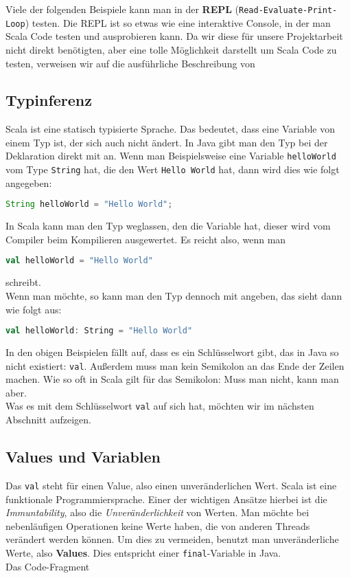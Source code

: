 Viele der folgenden Beispiele kann man in der \textbf{REPL} (\texttt{Read-Evaluate-Print-Loop}) testen. Die REPL ist so etwas wie eine interaktive Console, in der man Scala Code testen und ausprobieren kann. Da wir diese für unsere Projektarbeit nicht direkt benötigten, aber eine tolle Möglichkeit darstellt um Scala Code zu testen, verweisen wir auf die ausführliche Beschreibung von \cite{GettingStartedWithTheScalaREPL}

\subsection{Typinferenz}
Scala ist eine statisch typisierte Sprache. Das bedeutet, dass eine Variable von einem Typ ist, der sich auch nicht ändert. In Java gibt man den Typ bei der Deklaration direkt mit an. Wenn man Beispielsweise eine Variable \texttt{helloWorld} vom Type \texttt{String} hat, die den Wert \texttt{Hello World} hat, dann wird dies wie folgt angegeben:

\begin{lstlisting}[language=Java,numbers=none]
String helloWorld = "Hello World";
\end{lstlisting}

In Scala kann man den Typ weglassen, den die Variable hat, dieser wird vom Compiler beim Kompilieren ausgewertet. Es reicht also, wenn man

\begin{lstlisting}[language=Scala,numbers=none]
val helloWorld = "Hello World"
\end{lstlisting}

schreibt.\\
Wenn man möchte, so kann man den Typ dennoch mit angeben, das sieht dann wie folgt aus:

\begin{lstlisting}[language=Scala,numbers=none]
val helloWorld: String = "Hello World"
\end{lstlisting}

In den obigen Beispielen fällt auf, dass es ein Schlüsselwort gibt, das in Java so nicht existiert: \texttt{val}. Außerdem muss man kein Semikolon an das Ende der Zeilen machen. Wie so oft in Scala gilt für das Semikolon: Muss man nicht, kann man aber.\\
Was es mit dem Schlüsselwort \texttt{val} auf sich hat, möchten wir im nächsten Abschnitt aufzeigen.

\subsection{Values und Variablen}
Das \texttt{val} steht für einen Value, also einen unveränderlichen Wert. Scala ist eine funktionale Programmiersprache. Einer der wichtigen Ansätze hierbei ist die \textit{Immuntability}, also die \textit{Unveränderlichkeit} von Werten. Man möchte bei nebenläufigen Operationen keine Werte haben, die von anderen Threads verändert werden können. Um dies zu vermeiden, benutzt man unveränderliche Werte, also \textbf{Values}. Dies entspricht einer \texttt{final}-Variable in Java.\\
Das Code-Fragment

